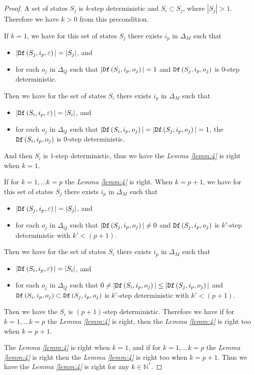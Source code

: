\begin{proof}
A set of states $S_j$ is $k$-step deterministic and $S_i\subset S_j$, where $|S_j|>1$. Therefore we have $k>0$ from this precondition.

If $k=1$, we have for this set of states $S_j$ there exists $i_p$ in $\Delta_M$ such that
 \begin{itemize}
 \item  $|{\tt Df}\left(S_j,i_p,\varepsilon\right)|=|S_j|$, and 
 \item  for each $o_j$ in $\Delta_Q$ such that $|{\tt Df}\left(S_j,i_p,o_j\right)|=1$ and ${\tt Df}\left(S_j,i_p,o_j\right)$ is $0$-step deterministic.
 \end{itemize}
 Then we have for the set of states $S_i$ there exists $i_p$ in $\Delta_M$ such that
 \begin{itemize}
 \item  $|{\tt Df}\left(S_i,i_p,\varepsilon\right)|=|S_i|$, and 
 \item  for each $o_j$ in $\Delta_Q$ such that $|{\tt Df}\left(S_i,i_p,o_j\right)|=|{\tt Df}\left(S_j,i_p,o_j\right)|=1$, the ${\tt Df}\left(S_i,i_p,o_j\right)$ is $0$-step deterministic.
 \end{itemize} And then $S_i$ is $1$-step deterministic, thus we have the {\em Lemma \ref{lemm:4}} is right when $k=1$.
 
 If for $k=1,\ldots k=p$ the {\em Lemma \ref{lemm:4}} is right. When $k=p+1$, we have  for this set of states $S_j$ there exists $i_p$ in $\Delta_M$ such that
 \begin{itemize}
 \item  $|{\tt Df}\left(S_j,i_p,\varepsilon\right)|=|S_j|$, and 
 \item  for each $o_j$ in $\Delta_Q$ such that $|{\tt Df}\left(S_j,i_p,o_j\right)|\neq 0$ and ${\tt Df}\left(S_j,i_p,o_j\right)$ is $k'$-step deterministic with  ${k'}<(p+1)$.
 \end{itemize}
 Then we have for the set of states $S_i$ there exists $i_p$ in $\Delta_M$ such that
 \begin{itemize}
 \item  $|{\tt Df}\left(S_i,i_p,\varepsilon\right)|=|S_i|$, and 
 \item  for each $o_j$ in $\Delta_Q$ such that $0\neq |{\tt Df}\left(S_i,i_p,o_j\right)| \le |{\tt Df}\left(S_j,i_p,o_j\right)|$ and ${\tt Df}\left(S_i,i_p,o_j\right)\subset {\tt Df}\left(S_j,i_p,o_j\right)$ is  $k'$-step deterministic with  ${k'}<(p+1)$.
 \end{itemize}  Then we have the $S_i$ is $(p+1)$-step deterministic. Therefore we have if for $k=1,\ldots k=p$ the {\em Lemma \ref{lemm:4}} is right, then the {\em Lemma \ref{lemm:4}} is right too when $k=p+1$. 

The {\em Lemma \ref{lemm:4}} is right when $k=1$, and if for $k=1,\ldots k=p$ the {\em Lemma \ref{lemm:4}} is right then the {\em Lemma \ref{lemm:4}} is right too when $k=p+1$. Thus we have the {\em Lemma \ref{lemm:4}} is right for any $k\in \mathbb{N}^*$.
 
\end{proof}

